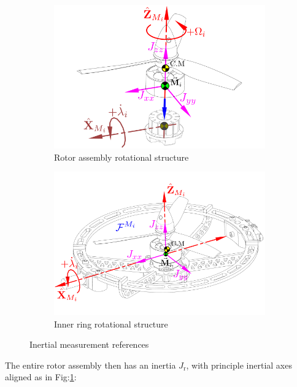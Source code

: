 \begin{figure}[htbp]
\centering
\begin{subfigure}{0.49\textwidth}
\includegraphics[width=\textwidth]{figs/inertia-prop}
\caption{Rotor assembly rotational structure}
\label{fig:inertia-prop}
\end{subfigure}
\begin{subfigure}{0.49\textwidth}
\includegraphics[width=\textwidth]{figs/inertia-inner}
\caption{Inner ring rotational structure}
\label{fig:inertia-inner}
\end{subfigure}
\caption{Inertial measurement references}
\vspace{-5pt}
\end{figure}
\par
The entire rotor assembly then has an inertia $J_\text{r}$, with principle inertial axes aligned as in Fig:\ref{fig:inertia-prop}:
